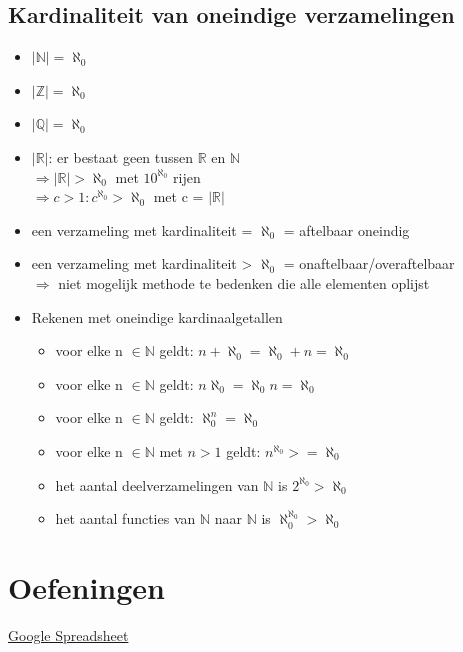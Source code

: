 \documentclass{article}
\begin{document}
\subsection{Kardinaliteit van oneindige verzamelingen}
\begin{itemize}
    \item $|\mathbb{N}| = \aleph_0$
    \item $|\mathbb{Z}| = \aleph_0$
    \item $|\mathbb{Q}| = \aleph_0$
    \item $|\mathbb{R}|$: er bestaat geen tussen $\mathbb{R}$ en $\mathbb{N}$
    \\ $\Rightarrow |\mathbb{R}| > \aleph_0$ met $10^{\aleph_0}$ rijen
    \\ $\Rightarrow c > 1: c^{\aleph_0} > \aleph_0$ met c = $|\mathbb{R}|$
    \item een verzameling met kardinaliteit = $\aleph_0$ = aftelbaar oneindig
    \item een verzameling met kardinaliteit > $\aleph_0$ = onaftelbaar/overaftelbaar
    \\ $\Rightarrow$ niet mogelijk methode te bedenken die alle elementen oplijst
    \item Rekenen met oneindige kardinaalgetallen
    \begin{itemize}
        \item voor elke n $\in \mathbb{N}$ geldt: $n + \aleph_0 = \aleph_0 + n = \aleph_0$
        \item voor elke n $\in \mathbb{N}$ geldt: $n\aleph_0 = \aleph_0 n = \aleph_0$
        \item voor elke n $\in \mathbb{N}$ geldt: $\aleph_0 ^ n = \aleph_0$
        \item voor elke n $\in \mathbb{N}$ met $n > 1$ geldt: $n ^ {\aleph_0} >= \aleph_0$
        \item het aantal deelverzamelingen van $\mathbb{N}$ is $2^{\aleph_0} > \aleph_0$
        \item het aantal functies van $\mathbb{N}$ naar $\mathbb{N}$ is $\aleph_0^{\aleph_0} > \aleph_0$
    \end{itemize}
\end{itemize}

\section{Oefeningen}
\href{https://docs.google.com/spreadsheets/d/1thtWaGEHPFeVuYDWK-XKuEimLSO2Zc_yDwdODAbYIok/edit#gid=0}{Google Spreadsheet}
\end{document}
